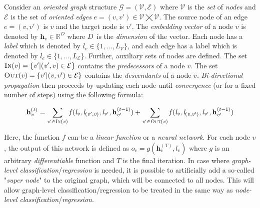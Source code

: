 Consider an \textit{oriented graph} structure $\mathcal{G} = (\mathcal{V}, \mathcal{E})$ where $\mathcal{V}$ is the \textit{set} of \textit{nodes} and $\mathcal{E}$ is the set of \textit{oriented edges} $\mathit{e} = ( \mathit{v}, \mathit{v}' ) \in \mathcal{V} \bigtimes \mathcal{V}$. The source node of an edge $\mathit{e} = ( \mathit{v}, \mathit{v}' )$ is $\mathit{v}$ and the target node is $\mathit{v}'$. The \textit{embedding vector} of a node $\mathit{v}$ is denoted by $\textbf{h}_\mathit{v} \in \mathbb{R}^\mathit{D}$ where $\mathit{D}$~is the \textit{dimension} of the vector. Each node has a \textit{label} which is denoted by $\mathit{l}_\mathit{v} \in \{1, ... , \mathit{L}_\mathcal{V}\}$, and each edge has a label which is denoted by $\mathit{l}_\mathit{e} \in \{1, ... , \mathit{L}_\mathcal{E}\}$. Further, auxiliary sets of nodes are defined. The set $\textsc{In}(\mathit{v}) = \{\mathit{v}' | (\mathit{v}', \mathit{v}) \in \mathcal{E}\}$ contains the \textit{predecessors} of a node $\mathit{v}$. The set $\textsc{Out}(\mathit{v}) = \{\mathit{v}' | (\mathit{v}, \mathit{v}') \in \mathcal{E}\}$ contains the \textit{descendants} of a node $\mathit{v}$. \textit{Bi-directional propagation} then proceeds by updating each node until \textit{convergence} (or for a fixed number of steps) using the following formula:

\begin{equation*}
	\textbf{h}_\mathit{v}^{(\mathit{t})} = \sum_{\mathit{v}' \in \textsc{In}(\mathit{v})} \mathit{f}(\mathit{l}_\mathit{v}, \mathit{l}_{(\mathit{v}', \mathit{v})}, \mathit{l}_{\mathit{v}'}, \textbf{h}_{\mathit{v}'}^{(\mathit{t}-1)}) + \sum_{\mathit{v}' \in \textsc{Out}(\mathit{v})} \mathit{f}(\mathit{l}_\mathit{v}, \mathit{l}_{(\mathit{v}, \mathit{v}')}, \mathit{l}_{\mathit{v}'}, \textbf{h}_{\mathit{v}'}^{(\mathit{t}-1)})
\end{equation*}

Here, the function $\mathit{f}$ can be a \textit{linear function} or a \textit{neural network}. For each node $\mathit{v}$, the output of this network is defined as $\mathit{o}_\mathit{v} = \mathit{g}(\textbf{h}_\mathit{v}^{(\mathit{T})}, \mathit{l}_\mathit{v})$ where $\mathit{g}$ is an arbitrary \textit{differentiable} function and $\mathit{T}$ is the final iteration. In case where \textit{graph-level classification}/\textit{regression} is needed, it is possible to artificially add a so-called "\textit{super node}" to the original graph, which will be connected to all nodes. This will allow graph-level classification/regression to be treated in the same way as \textit{node-level classification}/\textit{regression}.

